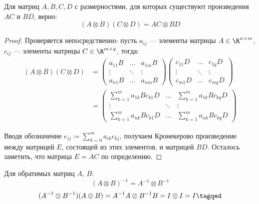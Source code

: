 \begin{theorem}Для матриц $A, B, C, D$ с размерностями, для которых существуют произведения $AC$ и $BD$, верно:
\begin{equation}\label{kroneckermixproducts}
(A \otimes B)(C \otimes D) = AC \otimes BD
\end{equation}
\begin{proof}
Проверяется непосредственно: пусть $a_{ij}$ --- элементы матрицы $A \in \R^{n \times m}$, $c_{ij}$ --- элементы матрицы $C \in \R^{m \times q}$, тогда:
\begin{align*}(A \otimes B)(C \otimes D) &=
\begin{pmatrix}
a_{11}B & \dots & a_{1m}B \\
\vdots & \ddots & \vdots \\
a_{n1}B & \dots & a_{nm}B
\end{pmatrix}
\begin{pmatrix}
c_{11}D & \dots & c_{1q}D \\
\vdots & \ddots & \vdots \\
c_{m1}D & \dots & c_{mq}D
\end{pmatrix} \\
&=
\begin{pmatrix}
\sum_{k = 1}^m a_{1k}Bc_{k1}D & \dots & \sum_{k = 1}^m a_{1k}Bc_{kq}D \\
\vdots & \ddots & \vdots \\
\sum_{k = 1}^m a_{nk}Bc_{k1}D & \dots & \sum_{k = 1}^m a_{nk}Bc_{kq}D
\end{pmatrix}
\end{align*}

Вводя обозначение $e_{ij} \coloneqq \sum_{k = 0}^m a_{ik}c_{kj}$, получаем Кронекерово произведение между матрицей $E$, состоящей из этих элементов, и матрицей $BD$. Осталось заметить, что матрица $E = AC$ по определению.
\end{proof}
\end{theorem}

\begin{proposition} Для обратимых матриц $A$, $B$:
\begin{equation}\label{kroneker_inverse}
(A \otimes B)^{-1} = A^{-1} \otimes B^{-1}
\end{equation}
\beginproof[Пояснение]
\begin{align*}
(A^{-1} \otimes B^{-1})(A \otimes B) = A^{-1}A \otimes B^{-1}B = I \otimes I = I \tagqed 
\end{align*}
\end{proposition}


